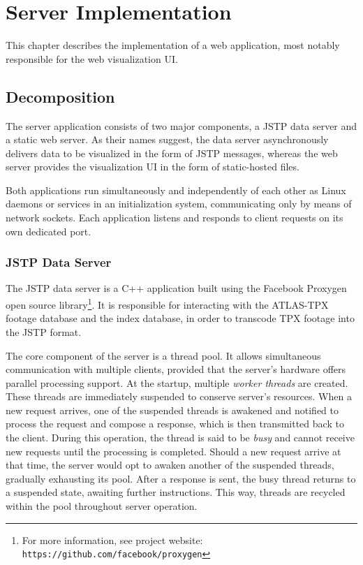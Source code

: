 \chapter{Server Implementation}
\label{chapter:server}
This chapter describes the implementation of a web application, most notably responsible for the web visualization UI.

\section{Decomposition}
The server application consists of two major components, a JSTP data server and a static web server. As their names suggest, the data server asynchronously delivers data to be visualized in the form of JSTP messages, whereas the web server provides the visualization UI in the form of static-hosted files.

Both applications run simultaneously and independently of each other as Linux daemons or services in an initialization system, communicating only by means of network sockets. Each application listens and responds to client requests on its own dedicated port.

\subsection{JSTP Data Server}
The JSTP data server is a C++ application built using the Facebook Proxygen open source library\footnote{For more information, see project website: \texttt{https://github.com/facebook/proxygen}}. It is responsible for interacting with the ATLAS-TPX footage database and the index database, in order to transcode TPX footage into the JSTP format.

The core component of the server is a thread pool. It allows simultaneous communication with multiple clients, provided that the server's hardware offers parallel processing support. At the startup, multiple \textit{worker threads} are created. These threads are immediately suspended to conserve server's resources. When a new request arrives, one of the suspended threads is awakened and notified to process the request and compose a response, which is then transmitted back to the client. During this operation, the thread is said to be \textit{busy} and cannot receive new requests until the processing is completed. Should a new request arrive at that time, the server would opt to awaken another of the suspended threads, gradually exhausting its pool. After a response is sent, the busy thread returns to a suspended state, awaiting further instructions. This way, threads are recycled within the pool throughout server operation.

